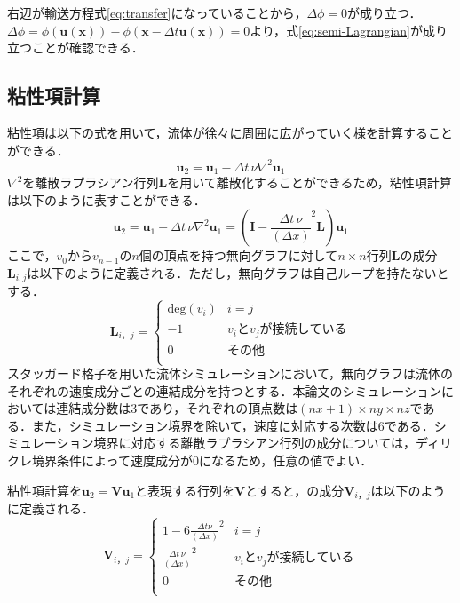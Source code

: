 \documentclass[a4j,12pt]{jreport}
\begin{document}
 右辺が輸送方程式\ref{eq:transfer}になっていることから，$ \varDelta \phi =0$が成り立つ．
$\varDelta \phi = \phi( \bm{u} (\bm{x})) - \phi (\bm{x} - \varDelta t\bm{u} (\bm{x}))= 0$より，式\ref{eq:semi-Lagrangian}が成り立つことが確認できる．
\subsection{粘性項計算}
粘性項は以下の式を用いて，流体が徐々に周囲に広がっていく様を計算することができる．
\[
\bm{u}_2   =  \bm{u}_1 - \varDelta t \,\nu\nabla^2\bm{u}_1
\]
$\nabla^2$を離散ラプラシアン行列$\bm{L}$を用いて離散化することができるため，粘性項計算は以下のように表すことができる．
\begin{equation}\label{eq:discrete Laplacian}
	\bm{u}_2   =  \bm{u}_1 - \varDelta t \,\nu\nabla^2\bm{u}_1 = (\bm{I} -  \frac{\varDelta t \,\nu}{(\varDelta x)}^2\bm{L})\bm{u}_1
\end{equation}
ここで，$v_0$から$v_{n-1}$の$n$個の頂点を持つ無向グラフに対して$n \times n$行列$\bm{L}$の成分$\bm{L}_{i,j}$は以下のように定義される．ただし，無向グラフは自己ループを持たないとする．
\[
	\bm{L}_{i，j} = \begin{cases}
 	\text{deg}(v_i) 	& i = j\\
 	-1  		& v_iとv_jが接続している\\
 	0  		& その他\\
 \end{cases}
\]
スタッガード格子を用いた流体シミュレーションにおいて，無向グラフは流体のそれぞれの速度成分ごとの連結成分を持つとする．本論文のシミュレーションにおいては連結成分数は3であり，それぞれの頂点数は$(nx+1) \times ny \times nz$である．また，シミュレーション境界を除いて，速度に対応する次数は$6$である．シミュレーション境界に対応する離散ラプラシアン行列の成分については，ディリクレ境界条件によって速度成分が$0$になるため，任意の値でよい．

粘性項計算を$\bm{u}_2   =  \bm{V}\bm{u}_1$と表現する行列を$\bm{V}$とすると，の成分$\bm{V}_{i，j}$は以下のように定義される．
 \[
 	\bm{V}_{i，j}  = \begin{cases}
 	1 - 6 \frac{\varDelta t \nu}{(\varDelta x)}^2 	& i = j\\
 	 \frac{\varDelta t \,\nu}{(\varDelta x)}^2  	& v_iとv_jが接続している\\
 	0  				& その他\\
	 \end{cases}
\]
\end{document}
